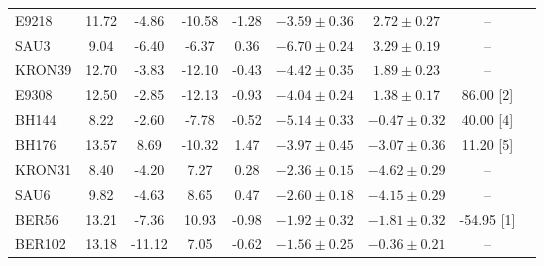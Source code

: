 \documentclass[draft]{aa}
\begin{document}
\begin{appendix}
\begin{table}
\begin{tabular}{lcccccccc}
    E9218 & 11.72 & -4.86 & -10.58  & -1.28 & $-3.59  \pm 0.36$ & $2.72 \pm 0.27$ & --\\  
    SAU3  & 9.04  & -6.40 & -6.37 & 0.36  & $-6.70  \pm 0.24$ & $3.29 \pm 0.19$ & --\\  
    KRON39  & 12.70 & -3.83 & -12.10  & -0.43 & $-4.42  \pm 0.35$ & $1.89 \pm 0.23$ & --\\  
    E9308 & 12.50 & -2.85 & -12.13  & -0.93 & $-4.04  \pm 0.24$ & $1.38 \pm 0.17$ & 86.00 [2]\\
    BH144 & 8.22  & -2.60 & -7.78 & -0.52 & $-5.14  \pm 0.33$ & $-0.47  \pm 0.32$ & 40.00 [4]\\
    BH176 & 13.57 & 8.69  & -10.32  & 1.47  & $-3.97  \pm 0.45$ & $-3.07  \pm 0.36$ & 11.20 [5]\\
    KRON31  & 8.40  & -4.20 & 7.27  & 0.28  & $-2.36  \pm 0.15$ & $-4.62  \pm 0.29$ & --\\  
    SAU6  & 9.82  & -4.63 & 8.65  & 0.47  & $-2.60  \pm 0.18$ & $-4.15  \pm 0.29$ & --\\  
    BER56 & 13.21 & -7.36 & 10.93 & -0.98 & $-1.92  \pm 0.32$ & $-1.81  \pm 0.32$ & -54.95  [1]\\
    BER102  & 13.18 & -11.12  & 7.05  & -0.62 & $-1.56  \pm 0.25$ & $-0.36  \pm 0.21$ & --\\  
    \hline
    \end{tabular}
  \end{table}

\end{appendix}
\end{document}

